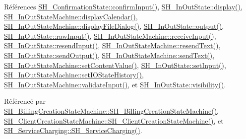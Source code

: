 Références \hyperlink{classSH__ConfirmationState_ae47d89a7fc0ada8eb51d8bef2317b348}{S\-H\-\_\-\-Confirmation\-State\-::confirm\-Input()}, \hyperlink{classSH__InOutState_a918e8a7f5fe00dc16004e46eeee1281d}{S\-H\-\_\-\-In\-Out\-State\-::display()}, \hyperlink{classSH__InOutStateMachine_a0d241868828cbf9798233a8c74c69851}{S\-H\-\_\-\-In\-Out\-State\-Machine\-::display\-Calendar()}, \hyperlink{classSH__InOutStateMachine_aeddfbc098f5ee8ac05eadbaf37803fb1}{S\-H\-\_\-\-In\-Out\-State\-Machine\-::display\-File\-Dialog()}, \hyperlink{classSH__InOutState_a1a2fd4f34484125058e20730aaee7e46}{S\-H\-\_\-\-In\-Out\-State\-::output()}, \hyperlink{classSH__InOutState_a4b1ca094de91c47690ec2d1e95678273}{S\-H\-\_\-\-In\-Out\-State\-::raw\-Input()}, \hyperlink{classSH__InOutStateMachine_ab224e4a6ab99c15770bc63e1b8fdb771}{S\-H\-\_\-\-In\-Out\-State\-Machine\-::receive\-Input()}, \hyperlink{classSH__InOutState_afa791181eb61a18d4337a04827f9b200}{S\-H\-\_\-\-In\-Out\-State\-::resend\-Input()}, \hyperlink{classSH__InOutStateMachine_a526822c66b46aa0cd81ba4473fa5573f}{S\-H\-\_\-\-In\-Out\-State\-Machine\-::resend\-Text()}, \hyperlink{classSH__InOutState_ad40e929a5537eb1d4883d5aa6eee5b15}{S\-H\-\_\-\-In\-Out\-State\-::send\-Output()}, \hyperlink{classSH__InOutStateMachine_ae2cbbe3cd207158668dcb4838938c7ad}{S\-H\-\_\-\-In\-Out\-State\-Machine\-::send\-Text()}, \hyperlink{classSH__InOutStateMachine_aa2766b7a7ba39c35a10df7fc0c151b4f}{S\-H\-\_\-\-In\-Out\-State\-Machine\-::set\-Content\-Value()}, \hyperlink{classSH__InOutState_a0206ab7d5616f28b0da7bfd5451614e8}{S\-H\-\_\-\-In\-Out\-State\-::set\-Input()}, \hyperlink{classSH__InOutStateMachine_a4b72e6da839782a211692a4d728c3925}{S\-H\-\_\-\-In\-Out\-State\-Machine\-::set\-I\-O\-State\-History()}, \hyperlink{classSH__InOutStateMachine_a5a5804bd32a04d25926f6e323b906887}{S\-H\-\_\-\-In\-Out\-State\-Machine\-::validate\-Input()}, et \hyperlink{classSH__InOutState_a8c496b2fe21a51a587c6e4409c0f37ec}{S\-H\-\_\-\-In\-Out\-State\-::visibility()}.



Référencé par \hyperlink{classSH__BillingCreationStateMachine_ad62b77fa4aeafe200056ff3974562f83}{S\-H\-\_\-\-Billing\-Creation\-State\-Machine\-::\-S\-H\-\_\-\-Billing\-Creation\-State\-Machine()}, \hyperlink{classSH__ClientCreationStateMachine_a0b406b0f404c0fd33bf35be8ce0cc811}{S\-H\-\_\-\-Client\-Creation\-State\-Machine\-::\-S\-H\-\_\-\-Client\-Creation\-State\-Machine()}, et \hyperlink{classSH__ServiceCharging_afa5273d046049b1c2b020a6a19a8290b}{S\-H\-\_\-\-Service\-Charging\-::\-S\-H\-\_\-\-Service\-Charging()}.


